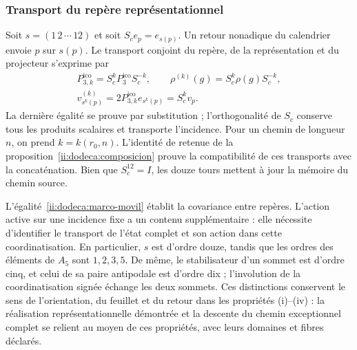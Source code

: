 \subsubsection{Transport du repère représentationnel}
\label{ii:dodeca:marco}
Soit \(s=(1\,2\,\cdots\,12)\) et soit \(S_ce_p=e_{s(p)}\).
Un retour nonadique du calendrier envoie \(p\) sur \(s(p)\). Le transport
conjoint du repère, de la représentation et du projecteur s’exprime par
\begin{equation}
 \begin{gathered}
 P_{3,k}^{\mathrm{ico}}=S_c^kP_3^{\mathrm{ico}}S_c^{-k},\qquad
 \rho^{(k)}(g)=S_c^k\rho(g)S_c^{-k},\\
 v^{(k)}_{s^k(p)}=2P_{3,k}^{\mathrm{ico}}e_{s^k(p)}=S_c^kv_p.
 \end{gathered}
 \label{ii:dodeca:marco-movil}
\end{equation}
La dernière égalité se prouve par substitution ; l’orthogonalité de
\(S_c\) conserve tous les produits scalaires et transporte
l’incidence. Pour un chemin de longueur \(n\), on prend
\(k=k(r_0,n)\). L’identité de retenue de la
proposition~\ref{ii:dodeca:composicion} prouve la compatibilité de
ces transports avec la concaténation. Bien que \(S_c^{12}=I\),
les douze tours mettent à jour la mémoire du chemin source.

L’égalité~\eqref{ii:dodeca:marco-movil} établit la covariance entre
repères. L’action active sur une incidence fixe a un contenu
supplémentaire : elle nécessite d’identifier le transport de l’état complet et son
action dans cette coordinatisation. En particulier, \(s\) est d’ordre douze, tandis
que les ordres des éléments de \(A_5\) sont \(1,2,3,5\).
De même, le stabilisateur d’un sommet est d’ordre cinq, et celui de sa
paire antipodale est d’ordre dix ; l’involution de la coordinatisation signée
échange les deux sommets. Ces distinctions conservent le sens
de l’orientation, du feuillet et du retour dans les propriétés (i)--(iv) : la
réalisation représentationnelle démontrée et la descente du chemin
exceptionnel complet se relient au moyen de ces propriétés, avec leurs
domaines et fibres déclarés.

